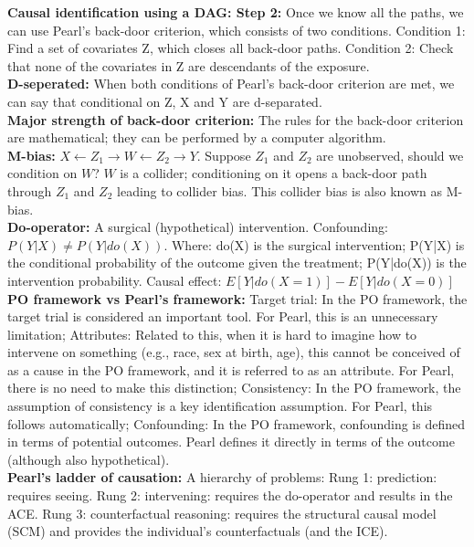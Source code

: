 \documentclass[a4paper,7pt,landscape]{extarticle}
\begin{document}
\begin{multicols}{3}
\begin{boxA}
\textbf{Causal identification using a DAG: Step 2:} Once we know all the paths, we can use Pearl’s back-door criterion, which consists of two conditions. Condition 1: Find a set of covariates Z, which closes all back-door paths. Condition 2: Check that none of the covariates in Z are descendants of the exposure.\\
\textbf{D-seperated:} When both conditions of Pearl's back-door criterion are met, we can say that conditional on Z, X and Y are d-separated.\\
\textbf{Major strength of back-door criterion:} The rules for the back-door criterion are mathematical; they can be performed by a computer algorithm.\\
\textbf{M-bias:} $X \leftarrow Z_1 \rightarrow W \leftarrow Z_2 \rightarrow Y$. Suppose $Z_1$ and $Z_2$ are unobserved, should we condition on $W$? $W$ is a collider; conditioning on it opens a back-door path through $Z_1$ and $Z_2$ leading to collider bias. This collider bias is also known as M-bias.\\
\textbf{Do-operator:} A surgical (hypothetical) intervention. Confounding: $P(Y|X) \neq P(Y|do(X))$. Where: do(X) is the surgical intervention; P(Y|X) is the conditional probability of the outcome given the treatment; P(Y|do(X)) is the intervention probability. Causal effect: $E[Y|do(X = 1)]-E[Y|do(X = 0)]$\\
\textbf{PO framework vs Pearl's framework:} Target trial: In the PO framework, the target trial is considered an important tool. For Pearl, this is an unnecessary limitation; Attributes: Related to this, when it is hard to imagine how to intervene on something (e.g., race, sex at birth, age), this cannot be conceived of as a cause in the PO framework, and it is referred to as an attribute. For Pearl, there is no need to make this distinction; Consistency: In the PO framework, the assumption of consistency is a key identification assumption. For Pearl, this follows automatically; Confounding: In the PO framework, confounding is defined in terms of potential outcomes. Pearl defines it directly in terms of the outcome (although also hypothetical).\\
\textbf{Pearl’s ladder of causation:} A hierarchy of problems: Rung 1: prediction: requires seeing. Rung 2: intervening: requires the do-operator and results in the ACE. Rung 3: counterfactual reasoning: requires the structural causal model (SCM) and provides the individual’s counterfactuals (and the ICE).\\

\end{boxA}
\end{multicols}
\end{document}
